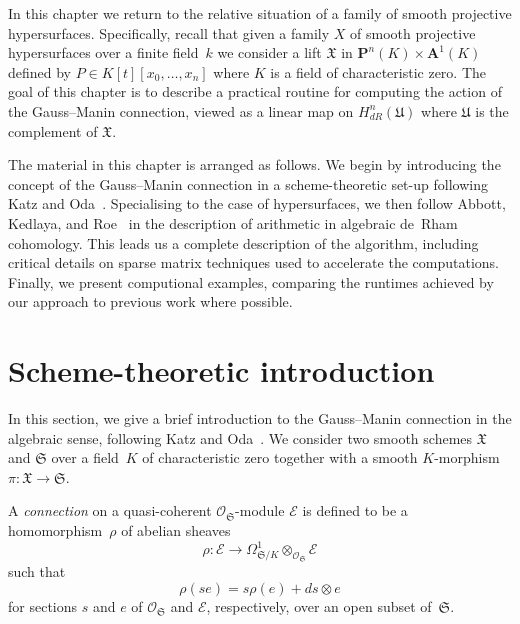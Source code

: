 
In this chapter we return to the relative situation of a family of 
smooth projective hypersurfaces.  Specifically, recall that given 
a family $X$ of smooth projective hypersurfaces over a finite field~$k$ 
we consider a lift $\mathfrak{X}$ in $\mathbf{P}^n(K) \times \mathbf{A}^1(K)$ 
defined by $P \in K[t][x_0, \dotsc, x_n]$ where $K$ is a field of 
characteristic zero.  The goal of this chapter is to 
describe a practical routine for computing the action of the Gauss--Manin 
connection, viewed as a linear map on $H_{dR}^n(\mathfrak{U})$ where 
$\mathfrak{U}$ is the complement of $\mathfrak{X}$.

The material in this chapter is arranged as follows.  We begin by introducing 
the concept of the Gauss--Manin connection in a scheme-theoretic set-up 
following Katz and Oda~\citep{KatzOda1968}.  Specialising to the case of 
hypersurfaces, we then follow Abbott, Kedlaya, and 
Roe~\citep{AbbottKedlayaRoe2006} in the description of arithmetic 
in algebraic de~Rham cohomology.  This leads us a complete description of the 
algorithm, including critical details on sparse matrix techniques used to 
accelerate the computations.  Finally, we present computional examples, 
comparing the runtimes achieved by our approach to previous work where 
possible.


\section{Scheme-theoretic introduction}

In this section, we give a brief introduction to the Gauss--Manin connection 
in the algebraic sense, following Katz and Oda~\citep{KatzOda1968}.  
We consider two smooth schemes $\mathfrak{X}$ and $\mathfrak{S}$ over a 
field~$K$ of characteristic zero together with a smooth $K$-morphism 
$\pi \colon \mathfrak{X} \to \mathfrak{S}$.

\begin{defn}
A \emph{connection} on a quasi-coherent $\mathcal{O}_{\mathfrak{S}}$-module 
$\mathcal{E}$ is defined to be a homomorphism~$\rho$ of abelian sheaves
\begin{equation*}
\rho \colon \mathcal{E} \to 
    \Omega_{\mathfrak{S}/K}^1 \otimes_{\mathcal{O}_{\mathfrak{S}}} \mathcal{E}
\end{equation*}
such that
\begin{equation*}
\rho(s e) = s \rho(e) + ds \otimes e
\end{equation*}
for sections $s$ and $e$ of $\mathcal{O}_{\mathfrak{S}}$ and $\mathcal{E}$, 
respectively, over an open subset of~$\mathfrak{S}$.
\end{defn}

